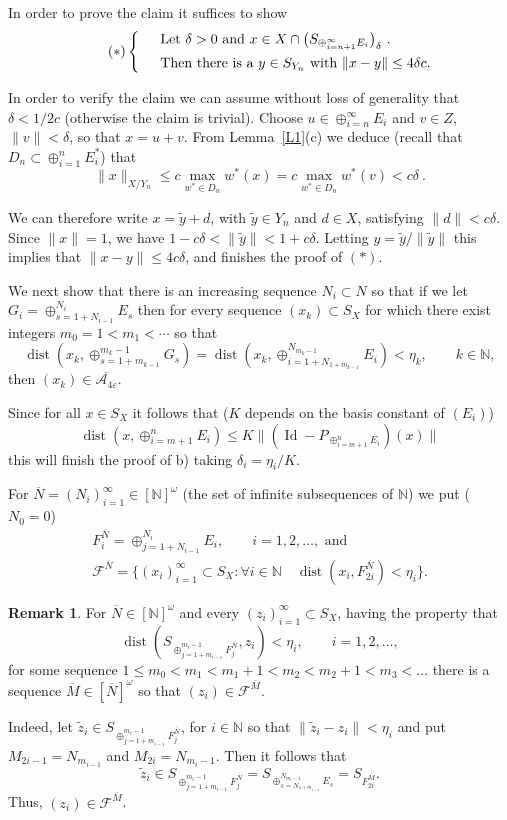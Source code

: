 \documentclass[11pt,leqno]{amsart}
\theoremstyle{definition}
\newtheorem*{remark}{Remark}
\newcommand{\ds}{\displaystyle}
\newcommand{\vp}{\varepsilon}
\newcommand{\dist}{\operatorname{dist}}
\newcommand{\Id}{\operatorname{Id}}
\newcommand{\cF}{\mathcal{F}}
\newcommand{\cA}{\mathcal{A}}
\newcommand{\N}{\mathbb{N}}
\newcommand{\iN}{[\N]^{\omega}}
\newcommand{\iNN}{[\overline{N}]^{\omega}}
\newcommand{\bN}{\overline{N}}
\newcommand{\bM}{\overline{M}}
\begin{document}
In order to prove the claim it suffices to show 
\begin{equation}\tag*{$(*)$}
\left\{  \begin{array}{cl}
&\text{Let $\delta >0$ and\ }
x\in X\cap \bigl(S_{\oplus_{i=n+1}^\infty E_i}\bigr)_\delta\ .\\
\noalign{\vskip4pt}
&\text{Then there is a $y\in S_{Y_n}$ with $\|x-y\|\le 4\delta c$.}
\end{array} \right.
\end{equation}

In order to verify the claim we can assume without loss of generality that $\delta<1/2c$ 
(otherwise the claim is trivial).
Choose $u\in\oplus_{i=n}^{\infty} E_i$ and $v\in Z$, $\|v\|<\delta$, 
so that $x=u+v$.
{From} Lemma~\ref{L1}(c) we deduce (recall that 
$D_n\subset \oplus_{i=1}^n E^*_i$) that
$$\|x\|_{X/Y_n}\le c\max_{w^*\in D_n} w^*(x)
= c\max_{w^*\in D_n} w^*(v)< c\delta\ .$$

We can therefore write $x=\tilde y +d$, with $\tilde y\in Y_n$ and 
$d\in X$, satisfying $\|d\|<c\delta$. Since
$\|x\|=1$, we have $1-c\delta<\|\tilde y\|<1+c\delta$. 
Letting $y=\tilde y/\|\tilde y\|$ this implies that $\|x-y\|\le 4c\delta$, 
and finishes the proof of $(*)$.

We next show that there is an increasing sequence $N_i\subset N$ so that
if we let $G_i = \oplus_{s=1+N_{i-1}}^{N_i} E_s$ then  
for every sequence $(x_k)\subset S_X$ for which
there exist integers $m_0=1<m_1<\cdots$ so that
$$
\dist(x_k,\oplus_{s=1+m_{k-1}}^{m_k-1} G_s) =
\dist(x_k,\oplus_{i=1+N_{1+m_{k-1}}}^{N_{m_k-1}} E_i)<\eta_k,\qquad k\in\N,$$
then $(x_k)\in \overline{\cA_{4\vp}}$. 

Since for all $x\in S_X$ it follows that  
($K$ depends on the basis constant of $(E_i)$) 
$$\dist(x,\oplus_{i=m+1}^n E_i)
\le K \|(\Id - P_{\oplus_{i=m+1}^n E_i})(x)\|$$
this will finish the proof of b) taking $\delta_i=\eta_i/K$.

For $\bN=(N_i)_{i=1}^\infty\in\iN$ (the set of infinite subsequences of $\N$) 
we put ($N_0=0$) 
\begin{gather}
F^{\bN}_i=\oplus_{j=1+N_{i-1}}^{N_i} E_i,\qquad i=1,2,\ldots, \text{ and }
\label{E18}\\
\cF^{\bN}=\bigl\{(x_i)_{i=1}^\infty\subset S_X :\forall i\in\N 
\quad\dist(x_i,F^{\bN}_{2i})<\eta_i\bigr\}.
\label{E19}
\end{gather}

\begin{remark} 
For $\bN\in\iN$ and every $(z_i)_{i=1}^\infty\subset S_X$, 
having the property that 
$$\dist(S_{\ds\oplus_{j=1+m_{i-1}}^{m_i-1} F_j^{\bN}}, z_i)<\eta_i,
\qquad i=1,2,\ldots,$$
for some sequence $1\le m_0<m_1<m_1+1<m_2<m_2+1<m_3<\ldots$ there is a sequence
$\bM\in\iNN$ so that $(z_i)\in\cF^{\bM}$.

Indeed, let $\tilde z_i\in S_{\ds\oplus_{j=1+m_{i-1}}^{m_i-1} F_j^{\bN}}$, 
for $i\in\N$ so that $\|\tilde z_i-z_i\|<\eta_i$ and
put $M_{2i-1}=N_{m_{i-1}}$ and $M_{2i}=N_{m_i-1}$. Then it follows that
$$\tilde z_i\in S_{\ds\oplus_{j=1+m_{i-1}}^{m_i-1} F_j^{\bN}}=
S_{\ds\oplus_{s=N_{1+m_{i-1}}}^{N_{m_i-1}} E_s}=S_{F^{\bM}_{2i}}.$$
Thus, $(z_i)\in\cF^{\bM}$.
\end{remark}
      
\end{document}
